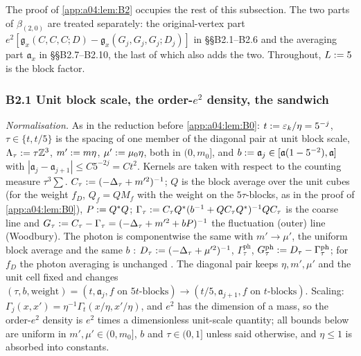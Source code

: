 \providecommand{\ph}{\mathrm{ph}}
\providecommand{\Mh}{\ensuremath{\hat M}}
\providecommand{\Pih}{\ensuremath{\hat\Pi}}
\providecommand{\cell}{\mathrm{cell}}
\providecommand{\BZ}{\ensuremath{\mathsf B}}
\providecommand{\Bc}{\ensuremath{B^{\mathrm c}}}

The proof of \cref{app:a04:lem:B2} occupies the rest of this subsection. The two parts of $\beta_{(2,0)}$ are treated separately: the original-vertex part $e^2[\mathfrak g_x(C,C,C;D)-\mathfrak g_x(G_j,G_j,G_j;D_j)]$ in \S\S B2.1--B2.6 and the averaging part $\mathfrak a_x$ in \S\S B2.7--B2.10, the last of which also adds the two. Throughout, $L:=5$ is the block factor.

\subsubsection*{B2.1 Unit block scale, the order-$e^2$ density, the sandwich}

\emph{Normalisation.} As in the reduction before \cref{app:a04:lem:B0}: $t:=\varepsilon_k/\eta=5^{-j}$, $\tau\in\{t,t/5\}$ is the spacing of one member of the diagonal pair at unit block scale, $\Lambda_\tau:=\tau\mathbb Z^3$, $m':= m\eta$, $\mu':=\mu_0\eta$, both in $(0,m_0]$, and $b:=\mathfrak a_j\in[\mathfrak a(1-5^{-2}),\mathfrak a]$ with $|\mathfrak a_j-\mathfrak a_{j+1}|\le C5^{-2j}=Ct^2$. Kernels are taken with respect to the counting measure $\tau^3\sum$. $C_\tau:=(-\Delta_\tau+m'^2)^{-1}$; $Q$ is the block average over the unit cubes (for the weight $f_D$, $Q_f=QM_f$ with the weight on the $5\tau$-blocks, as in the proof of \cref{app:a04:lem:B0}), $P:= Q^*Q$; $\Gamma_\tau:= C_\tau Q^*(b^{-1}+QC_\tau Q^*)^{-1}QC_\tau$ is the coarse line and $G_\tau:= C_\tau-\Gamma_\tau=(-\Delta_\tau+m'^2+bP)^{-1}$ the fluctuation (outer) line (Woodbury). The photon is componentwise the same with $m'\to\mu'$, the uniform block average and the same $b$ \cite[(2.6), (2.10), (2.16)--(2.17)]{K1}: $D_\tau:=(-\Delta_\tau+\mu'^2)^{-1}$, $\Gamma^\ph_\tau$, $G^\ph_\tau\defeq D_\tau-\Gamma^\ph_\tau$; for $f_D$ the photon averaging is unchanged \cite[p.~328]{K2}. The diagonal pair keeps $\eta,m',\mu'$ and the unit cell fixed and changes $(\tau,b,\text{weight})=(t,\mathfrak a_j,f\text{ on }5t\text{-blocks})\to(t/5,\mathfrak a_{j+1},f\text{ on }t\text{-blocks})$. Scaling: $\Gamma_j(x,x')=\eta^{-1}\Gamma_t(x/\eta,x'/\eta)$, and $e^2$ has the dimension of a mass, so the order-$e^2$ density is $e^2$ times a dimensionless unit-scale quantity; all bounds below are uniform in $m',\mu'\in(0,m_0]$, $b$ and $\tau\in(0,1]$ unless said otherwise, and $\eta\le1$ is absorbed into constants.

